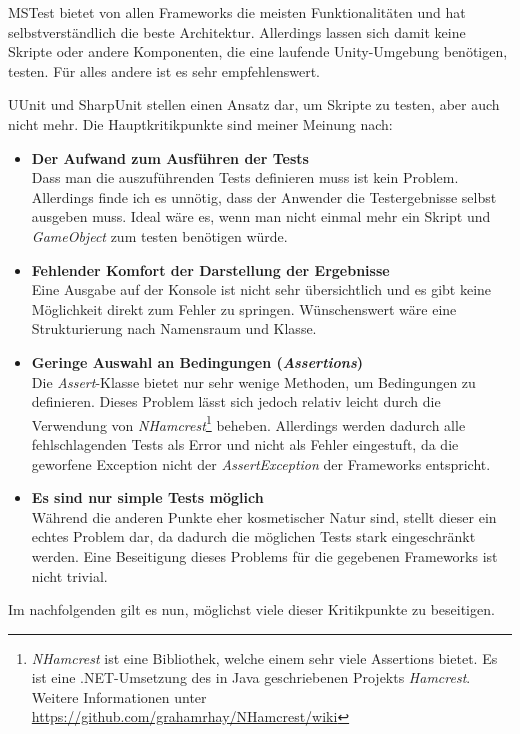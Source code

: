 MSTest bietet von allen Frameworks die meisten Funktionalitäten und hat selbstverständlich die beste Architektur. Allerdings lassen sich damit keine Skripte oder andere Komponenten, die eine laufende Unity-Umgebung benötigen, testen. Für alles andere ist es sehr empfehlenswert.

UUnit und SharpUnit stellen einen Ansatz dar, um Skripte zu testen, aber auch nicht mehr. Die Hauptkritikpunkte sind meiner Meinung nach:
\begin{itemize}
\item \textbf{Der Aufwand zum Ausführen der Tests}\\
Dass man die auszuführenden Tests definieren muss ist kein Problem. Allerdings finde ich es unnötig, dass der Anwender die Testergebnisse selbst ausgeben muss. Ideal wäre es, wenn man nicht einmal mehr ein Skript und \textit{GameObject} zum testen benötigen würde.
\item \textbf{Fehlender Komfort der Darstellung der Ergebnisse}\\
Eine Ausgabe auf der Konsole ist nicht sehr übersichtlich und es gibt keine Möglichkeit direkt zum Fehler zu springen. Wünschenswert wäre eine Strukturierung nach Namensraum und Klasse.
\item \textbf{Geringe Auswahl an Bedingungen (\textit{Assertions})}\\
Die \textit{Assert}-Klasse bietet nur sehr wenige Methoden, um Bedingungen zu definieren. Dieses Problem lässt sich jedoch relativ leicht durch die Verwendung von \textit{NHamcrest}\footnote{\textit{NHamcrest} ist eine Bibliothek, welche einem sehr viele Assertions bietet. Es ist eine .NET-Umsetzung des in Java geschriebenen Projekts \textit{Hamcrest}. Weitere Informationen unter \url{https://github.com/grahamrhay/NHamcrest/wiki}} beheben. Allerdings werden dadurch alle fehlschlagenden Tests als Error und nicht als Fehler eingestuft, da die geworfene Exception nicht der \textit{AssertException} der Frameworks entspricht.
\item \textbf{Es sind nur simple Tests möglich}\\
Während die anderen Punkte eher kosmetischer Natur sind, stellt dieser ein echtes Problem dar, da dadurch die möglichen Tests stark eingeschränkt werden. Eine Beseitigung dieses Problems für die gegebenen Frameworks ist nicht trivial.
\end{itemize}

Im nachfolgenden gilt es nun, möglichst viele dieser Kritikpunkte zu beseitigen.
